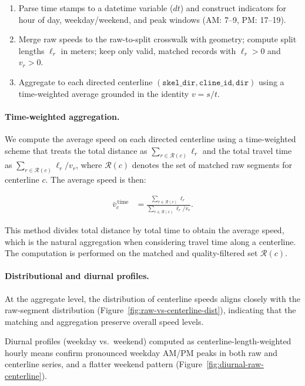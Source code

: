 \documentclass[12pt]{article}
\begin{document}
	\begin{enumerate}
		\item Parse time stamps to a datetime variable ($dt$) and construct indicators for hour of day, weekday/weekend, and peak windows (AM: 7--9, PM: 17--19).
		
		\item Merge raw speeds to the raw-to-split crosswalk with geometry; compute split lengths $\ell_r$ in meters; keep only valid, matched records with $\ell_r>0$ and $v_r>0$.
		
		\item Aggregate to each directed centerline $(\texttt{skel\_dir}, \texttt{cline\_id}, \texttt{dir})$ using a time-weighted average grounded in the identity $v=s/t$.
	\end{enumerate}
	
	\paragraph{Time-weighted aggregation.}
	
	We compute the average speed on each directed centerline using a time-weighted scheme that treats the total distance as $\sum_{r \in \mathcal{R}(c)} \ell_r$ and the total travel time as $\sum_{r \in \mathcal{R}(c)} \ell_r / v_r$, where $\mathcal{R}(c)$ denotes the set of matched raw segments for centerline $c$. The average speed is then:
	
	\begin{align}
		\bar{v}_c^{\,\text{time}}
		&= \frac{\sum_{r \in \mathcal{R}(c)} \ell_r}{\sum_{r \in \mathcal{R}(c)} \ell_r / v_r}.
		\label{eq:centerline_speed}
	\end{align}
	
	This method divides total distance by total time to obtain the average speed, which is the natural aggregation when considering travel time along a centerline. The computation is performed on the matched and quality-filtered set $\mathcal{R}(c)$.
	
	\paragraph{Distributional and diurnal profiles.}
	
	At the aggregate level, the distribution of centerline speeds aligns closely with the raw-segment distribution (Figure~\ref{fig:raw-vs-centerline-dist}), indicating that the matching and aggregation preserve overall speed levels.
	
	Diurnal profiles (weekday vs.\ weekend) computed as centerline-length-weighted hourly means confirm pronounced weekday AM/PM peaks in both raw and centerline series, and a flatter weekend pattern (Figure~\ref{fig:diurnal-raw-centerline}).
	
\end{document}
